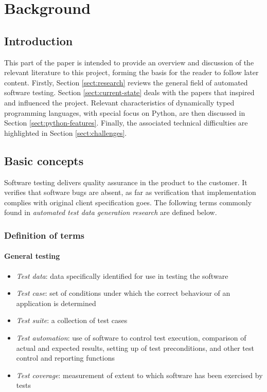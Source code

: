 \documentclass{icldt}
\numberwithin{equation}{section}       %
\begin{document}
\chapter{Background}
\label{ch:background}
\section{Introduction}
This part of the paper is intended to provide an overview and discussion of the relevant literature to this project, forming the basis for the reader to follow later content. Firstly, Section \ref{sect:research} reviews the general field of automated software testing. Section \ref{sect:current-state} deals with the papers that inspired and influenced the project. Relevant characteristics of dynamically typed programming languages, with special focus on Python, are then discussed in Section \ref{sect:python-features}. Finally, the associated technical difficulties are highlighted in Section \ref{sect:challenges}.
\section{Basic concepts}
Software testing delivers quality assurance in the product to the customer. It verifies that software bugs are absent, as far as verification that implementation complies with original client specification goes. The following terms commonly found in \emph{automated test data generation research} are defined below.

\subsection{Definition of terms}
\subsubsection{General testing}
\begin{itemize}
	\item \emph{Test data}: data specifically identified for use in testing the software
	\item \emph{Test case}: set of conditions under which the correct behaviour of an application is determined
	\item \emph{Test suite}: a collection of test cases
	\item \emph{Test automation}: use of software to control test execution, comparison of actual and expected results, setting up of test preconditions, and other test control and reporting functions
	\item \emph{Test coverage}: measurement of extent to which software has been exercised by tests
\end{itemize}
\end{document}
